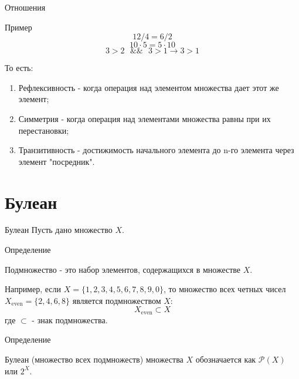 \documentclass{beamer}
\newenvironment{rusdefinition}[1][Определение]{
    \begin{block}{#1}
}{\end{block}}
\newenvironment{rexample}[1][Пример]{\begin{exampleblock}{#1}}{\end{exampleblock}}
\begin{document}
\begin{frame}{Отношения}
    \begin{rexample}    
    \[ 12/4 = 6/2 \] 
    \[ 10 \cdot 5 = 5 \cdot 10 \]
    \[ 3 > 2 \texttt{ } \&\& \texttt{ } 3 > 1 \rightarrow 3 > 1 \] 
\end{rexample}
То есть:
\begin{enumerate}
    \item Рефлексивность - когда операция над элементом множества дает этот же элемент;
    \item Симметрия - когда операция над элементами множества равны при их перестановки;
    \item Транзитивность - достижимость начального элемента до n-го элемента через элемент "посредник".
\end{enumerate}
\end{frame}

\section{Булеан}

\begin{frame}{Булеан}
    Пусть дано множество $X$. 

    \begin{rusdefinition}
        Подмножество - это набор элементов, содержащихся в множестве $X$. 
    \end{rusdefinition}

    Например, если $X = \{1,2,3,4,5,6,7,8,9,0\}$, то множество всех четных чисел 
    $X_{\text{even}} = \{2,4,6,8\}$ является подмножеством $X$:
    \[ X_{\text{even}} \subset X \]
    где $\subset$ - знак подмножества.

    \begin{rusdefinition}
        Булеан (множество всех подмножеств) множества $X$ обозначается как $\mathcal{P}(X)$ или $2^X$.
    \end{rusdefinition}
\end{frame}
\end{document}
